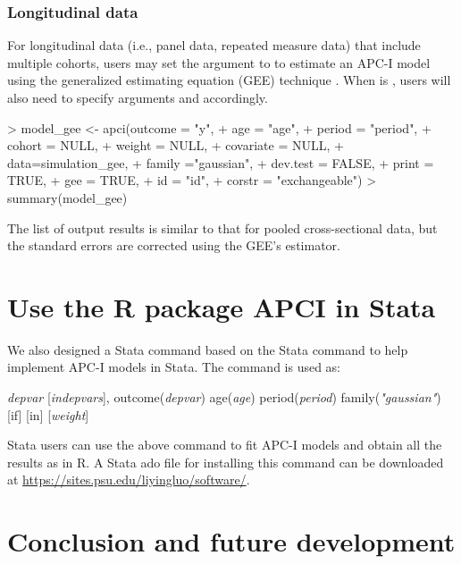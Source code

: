 \subsubsection{Longitudinal data} \label{example2:gee}

For longitudinal data (i.e., panel data, repeated measure data) that include multiple cohorts, users may set the argument {} to {} to estimate an APC-I model using the generalized estimating equation (GEE) technique \citep{liang1986longitudinal,geerpackage}. When {} is {}, users will also need to specify arguments {} and {} accordingly. 

\begin{example}
> model_gee <- apci(outcome = "y",
+                  age = "age",
+                  period = "period",
+                  cohort = NULL,
+                  weight = NULL,
+                  covariate = NULL,
+                  data=simulation_gee,
+                  family ="gaussian",
+                  dev.test = FALSE,
+                  print = TRUE,
+                  gee = TRUE,
+                  id = "id",
+                  corstr = "exchangeable")
> summary(model_gee)
\end{example}

The list of output results is similar to that for pooled cross-sectional data, but the standard errors are corrected using the GEE's {} estimator. 

\section{Use the R package APCI in Stata} \label{stata}

We also designed a Stata command  based on the Stata command  \citep{haghish_seamless_2019} to help implement APC-I models in Stata. The command is used as:

 \textit{depvar} [\textit{indepvars}], outcome(\textit{depvar}) age(\textit{age}) period(\textit{period}) family(\textit{"gaussian"}) [if] [in] [\textit{weight}]


Stata users can use the above command to fit APC-I models and obtain all the results as in R. A Stata ado file for installing this command can be downloaded at \url{https://sites.psu.edu/liyingluo/software/}.


\section{Conclusion and future development} \label{conclusion}


